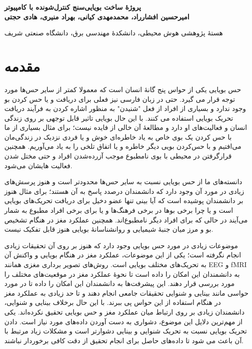 \documentclass[oneside]{report}
\begin{document}
\thispagestyle{empty}
\begin{flushright}
\vspace*{4cm}
{\Large \bf پروژهٔ ساخت بویایی‌سنج کنترل‌شونده با کامپیوتر}\\
{\bf
امیرحسین افشارراد، محمد‌مهدی کیانی، بهراد منیری، هادی حجتی
}


هستهٔ پژوهشی هوش محیطی، دانشکدهٔ مهندسی برق، دانشگاه صنعتی شریف

\end{flushright}
\vspace {.5cm}
 

\paragraphfootnotes
\section*{مقدمه}
حس بویایی یکی از حواس پنج گانهٔ انسان است که معمولا کمتر از سایر حس‌ها مورد توجه قرار می گیرد. حتی در زبان فارسی نیز فعلی برای دریافت و یا حس کردن بو وجود ندارد و بسیاری از افراد از فعل "شنیدن" به منظور اشاره کردن به فرآیند دریافت تحریک بویایی استفاده می کنند.
با این حال بویایی تاثیر قابل توجهی بر روی زندگی انسان و فعالیت‌های او دارد و مطالعهٔ آن خالی از فایده نیست؛ برای مثال بسیاری از ما با حس کردن یک بوی خاص به یاد خاطره‌ای خوش و یا فردی نزدیک در زندگی‌مان می‌افتیم و با حس‌کردن بویی دیگر خاطره و یا اتفاق تلخی را به یاد می‌آوریم. همچنین قرار‌گرفتن در محیطی با بوی نامطبوع موجب آزرده‌شدن افراد و حتی مختل شدن فعالیت هایشان می‌شود.


دانسته‌های ما از حس بویایی نسبت به سایر حس‌ها محدود‌تر است و هنوز پرسش‌های زیادی در مورد آن وجود دارد که دانشمندان درصدد پاسخ به آن هستند؛ برای مثال هنوز بر دانشمندان پوشیده است که آیا بینی تنها عضو دخیل برای دریافت تحریک‌های
بویایی است و یا چرا برخی بوها در برخی فرهنگ‌ها و یا برای برخی افراد مطبوع به شمار می‌آیند در حالی که برای افراد دیگر نامطبوع‌اند. همچنین عملکرد مغز در هنگام تشخیص بو و مرز میان جنبهٔ شیمیایی و روانشناسانهٔ بویایی هنوز قابل تفکیک نیست.


موضوعات زیادی در مورد حس بویایی وجود دارد که هنوز بر روی آن تحقیقات زیادی انجام نگرفته است؛ یکی از این موضوعات، عملکرد مغز در هنگام بویایی و واکنش آن به تحریک‌های مختلف بویایی است. روش‌های تصویر برداری مغزی همانند EEG و fMRI به دانشمندان این امکان را داده است تا نحوهٔ عملکرد مغز در موقعیت‌های مختلف را مورد بررسی قرار دهند. این پیشرفت‌ها به دانشمندان این امکان را داده تا در مورد حواسی مانند بینایی و شنوایی تحقیقات جامعی انجام دهند و تا حد زیادی به عملکرد مغز در هنگام استفاده از این حواس پی ببرند. با این حال برخلاف بینایی و شنوایی، دانشمندان زیادی بر روی ارتباط میان عملکرد مغز و حس بویایی تحقیق نکرده‌اند. یکی از مهم‌ترین دلایل این موضوع، دشواری به دست آوردن داده‌های مورد نیاز است. دادن تحریک بویایی نسبت به تحریک شنوایی و بینایی دشوارتر است و مشکلات زیاد مرتبط با آن باعث می شود تا داده‌های حاصل برای انجام تحقیق از دقت کافی برخوردار نباشند.
\end{document}
